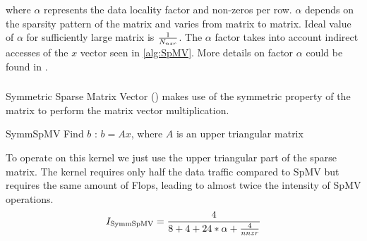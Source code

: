 where $\alpha$ represents the data locality factor and \NNZR non-zeros per row. $\alpha$ depends on the sparsity pattern of the matrix and varies from matrix to matrix. Ideal value of $\alpha$ for sufficiently large matrix is $\frac{1}{N_{nzr}}$. The $\alpha$ factor takes into account indirect accesses of the $x$ vector seen in \cref{alg:SpMV}. More details on factor $\alpha$ could be found in \cite{Moritz_sell}.

\begin{comment}
\subsubsection{\SpMTV}
Sparse Matrix Transpose Vector (\SpMTV) is a kernel having \DTWO dependency.
\begin{algorithm}[H]
	\caption{SpMTV Find $b$ : $b=A'x$} 
	\label{alg:SpMTV}
	\begin{algorithmic}[1]
		\FOR{$row=1:nrows$}
		\FOR{$idx=rowPtr[row]:rowPtr[row+1]$}
		\STATE{$b[col[idx]] += A[idx]*x[row]$} 
		\ENDFOR
		\ENDFOR
	\end{algorithmic}
\end{algorithm}
In comparison to SpMV operation, the kernel requires an extra scatter operation, which causes dependency. The arithmetic intensity of the kernel $I_\mathrm{\SpMTV}$ is given as:
\begin{equation}
\label{eq:SpMTV_intensity}
I_\mathrm{\SpMTV} = \frac{2}{8+4+16*\alpha+\frac{8}{\NNZRmath}} \\
\end{equation}

In ideal case data traffic for this kernel should remain close to that of SpMV, if \NNZR are sufficiently high, and $\alpha$ factor is small enough.
\end{comment}

\subsubsection{\SymmSpmv}
Symmetric Sparse Matrix Vector (\SymmSpmv) makes use of the symmetric property of the matrix to perform the matrix  vector multiplication.
\begin{algorithm}[H]
	\caption{SymmSpMV Find $b$ : $b=Ax$, where $A$ is an upper triangular matrix} 
	\label{alg:SymmSpMV}
	\begin{algorithmic}[1]
		\ENDFOR
		\ENDFOR
	\end{algorithmic}
\end{algorithm}
To operate on this kernel we just use the upper triangular part of the sparse matrix. The kernel requires only half the data traffic compared to SpMV but requires the same amount of Flops, leading to almost twice the intensity of SpMV operations.
\begin{equation}
\label{eq:SymmSpMV_intensity}
I_\mathrm{\SymmSpmv} = \frac{4}{8+4+24*\alpha+\frac{4}{nnzr}} \\
\end{equation}

